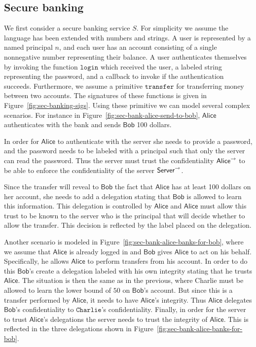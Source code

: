 \subsection{Secure banking}
We first consider a secure banking service $S$. For simplicity we assume the language has been extended with numbers and strings. A user is represented by a named principal $n$, and each user has an account consisting of a single nonnegative number representing their balance. A user authenticates themselves by invoking the function $\mathtt{login}$ which received the user, a labeled string representing the password, and a callback to invoke if the authentication succeeds. Furthermore, we assume a primitive $\mathtt{transfer}$ for transferring money between two accounts. The signatures of these functions is given in Figure~\ref{fig:sec-banking-sigs}.
Using these primitive we can model several complex scenarios. For instance in Figure~\ref{fig:sec-bank-alice-send-to-bob}, $\mathsf{Alice}$ authenticates with the bank and sends $\mathsf{Bob}$ 100 dollars.

In order for $\mathsf{Alice}$ to authenticate with the server she needs to provide a password, and the password needs to be labeled with a principal such that only the server can read the password. Thus the server must trust the confidentiality $\mathsf{Alice}^{\rightarrow}$ to be able to enforce the confidentiality of the server $\mathsf{Server}^{\rightarrow}$. 

Since the transfer will reveal to $\mathsf{Bob}$ the fact that $\mathsf{Alice}$ has at least 100 dollars on her account, she needs to add a delegation stating that $\mathsf{Bob}$ is allowed to learn this information. This delegation is controlled by $\mathsf{Alice}$ and $\mathsf{Alice}$ must allow this trust to be known to the server who is the principal that will decide whether to allow the transfer. This decision is reflected by the label placed on the delegation.

Another scenario is modeled in Figure~\ref{fig:sec-bank-alice-banks-for-bob}, where we assume that $\mathsf{Alice}$ is already logged in and $\mathsf{Bob}$ gives $\mathsf{Alice}$ to act on his behalf. Specifically, he allows $\mathsf{Alice}$ to perform transfers from his account. In order to do this $\mathsf{Bob}$'s create a delegation labeled with his own integrity stating that he trusts $\mathsf{Alice}$. The situation is then the same as in the previous, where Charlie must be allowed to learn the lower bound of $50$ on $\mathsf{Bob}$'s account. But since this is a transfer performed by $\mathsf{Alice}$, it needs to have $\mathsf{Alice}$'s integrity. Thus $\mathsf{Alice}$ delegates $\mathsf{Bob}$'s confidentiality to $\mathtt{Charlie}$'s confidentiality. Finally, in order for the server to trust $\mathsf{Alice}$'s delegations the server needs to trust the integrity of $\mathsf{Alice}$. This is reflected in the three delegations shown in Figure~\ref{fig:sec-bank-alice-banks-for-bob}.

